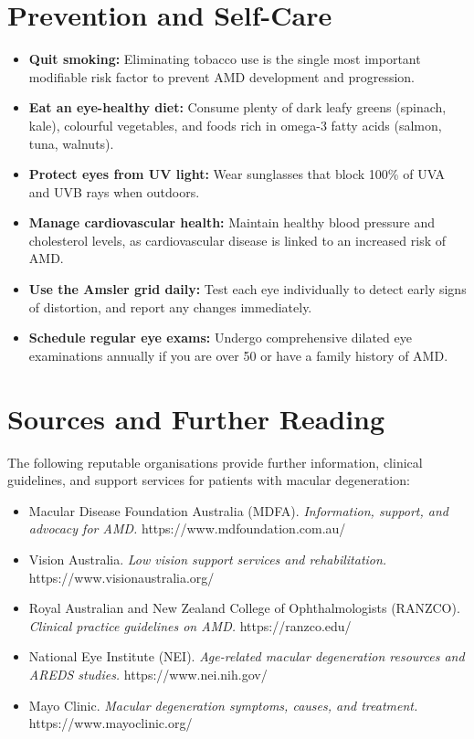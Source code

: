 \section*{Prevention and Self-Care}
\begin{itemize}
    \item \textbf{Quit smoking:} Eliminating tobacco use is the single most important modifiable risk factor to prevent AMD development and progression.
    \item \textbf{Eat an eye-healthy diet:} Consume plenty of dark leafy greens (spinach, kale), colourful vegetables, and foods rich in omega-3 fatty acids (salmon, tuna, walnuts).
    \item \textbf{Protect eyes from UV light:} Wear sunglasses that block 100\% of UVA and UVB rays when outdoors.
    \item \textbf{Manage cardiovascular health:} Maintain healthy blood pressure and cholesterol levels, as cardiovascular disease is linked to an increased risk of AMD.
    \item \textbf{Use the Amsler grid daily:} Test each eye individually to detect early signs of distortion, and report any changes immediately.
    \item \textbf{Schedule regular eye exams:} Undergo comprehensive dilated eye examinations annually if you are over 50 or have a family history of AMD.
\end{itemize}

\section*{Sources and Further Reading}
The following reputable organisations provide further information, clinical guidelines, and support services for patients with macular degeneration:
\begin{itemize}
    \item Macular Disease Foundation Australia (MDFA). \textit{Information, support, and advocacy for AMD.} https://www.mdfoundation.com.au/
    \item Vision Australia. \textit{Low vision support services and rehabilitation.} https://www.visionaustralia.org/
    \item Royal Australian and New Zealand College of Ophthalmologists (RANZCO). \textit{Clinical practice guidelines on AMD.} https://ranzco.edu/
    \item National Eye Institute (NEI). \textit{Age-related macular degeneration resources and AREDS studies.} https://www.nei.nih.gov/
    \item Mayo Clinic. \textit{Macular degeneration symptoms, causes, and treatment.} https://www.mayoclinic.org/
\end{itemize}
